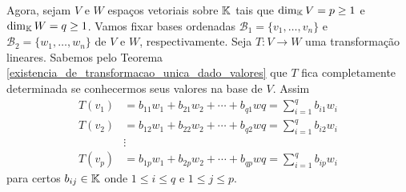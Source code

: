 Agora, sejam $V$ e $W$ espa\c{c}os vetoriais sobre $\mathbb{K}$ tais que $\dim_{\mathbb{K}}V = p \ge 1$ e $\dim_{\mathbb{K}} W = q \ge 1$. Vamos fixar bases ordenadas $\mathcal{B}_1 = \{v_1,\dots,v_n\}$ e $\mathcal{B}_2 = \{w_1,\dots,w_n\}$ de $V$ e $W$, respectivamente. Seja $T : V \to W$ uma transforma\c{c}\~ao lineares. Sabemos pelo Teorema \ref{existencia_de_transformacao_unica_dado_valores} que $T$ fica completamente determinada se conhecermos seus valores na base de $V$. Assim
\begin{align*}
	T(v_1) &= b_{11}w_1 + b_{21}w_2 + \cdots + b_{q1}wq = \sum_{i=1}^qb_{i1}w_i\\
	T(v_2) &= b_{12}w_1 + b_{22}w_2 + \cdots + b_{q2}wq = \sum_{i=1}^qb_{i2}w_i\\
	&\vdots\\
	T(v_p) &= b_{1p}w_1 + b_{2p}w_2 + \cdots + b_{qp}wq = \sum_{i=1}^qb_{ip}w_i
\end{align*}
para certos $b_{ij} \in \mathbb{K}$ onde $1 \le i \le q$ e $1 \le j \le p$.

